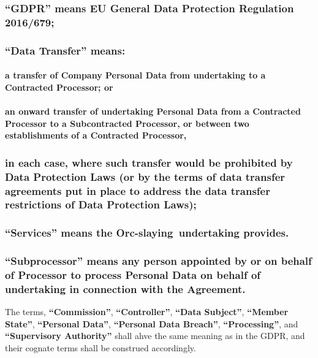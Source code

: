 \documentclass[a4paper]{article}
\newcommand{\services}{Orc-slaying}
\begin{document}
\subsubsection{\textbf{``GDPR''} means EU General Data Protection Regulation 2016/679;}

\subsubsection{\textbf{``Data Transfer''} means:}

\paragraph{a transfer of Company Personal Data from \gls{undertaking} to a Contracted Processor; or}

\paragraph{an onward transfer of \gls{undertaking} Personal Data from a Contracted Processor to a Subcontracted Processor, or between two establishments of a Contracted Processor,}

\noindent
\subsubsection*{in each case, where such transfer would be prohibited by Data Protection Laws (or by the terms of data transfer agreements put in place to address the data transfer restrictions of Data Protection Laws);}

\subsubsection{\textbf{``Services''} means the \services\ \gls{undertaking} provides.}

\subsubsection{\textbf{``Subprocessor''} means any person appointed by or on behalf of Processor to process Personal Data on behalf of \gls{undertaking} in connection with the Agreement.}

The terms, \textbf{``Commission''}, \textbf{``Controller''}, \textbf{``Data Subject''}, \textbf{``Member State''}, \textbf{``Personal Data''}, \textbf{``Personal Data Breach''}, \textbf{``Processing''}, and \textbf{``Supervisory Authority''} shall ahve the same meaning as in the GDPR, and their cognate terms shall be construed accordingly.
\end{document}
